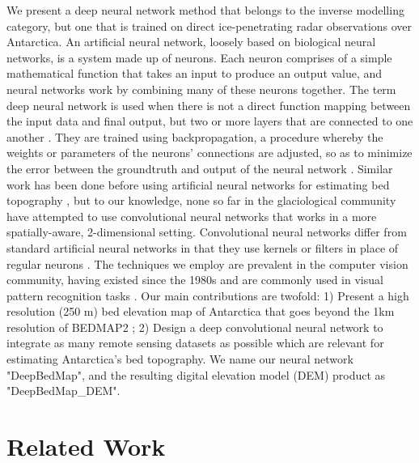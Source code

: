 \documentclass[tc, manuscript]{copernicus}
\begin{document}
We present a deep neural network method that belongs to the inverse modelling category, but one that is trained on direct ice-penetrating radar observations over Antarctica.
An artificial neural network, loosely based on biological neural networks, is a system made up of neurons.
Each neuron comprises of a simple mathematical function that takes an input to produce an output value, and neural networks work by combining many of these neurons together.
The term deep neural network is used when there is not a direct function mapping between the input data and final output, but two or more layers that are connected to one another \citep[see][for a review]{LeCunDeeplearning2015}.
They are trained using backpropagation, a procedure whereby the weights or parameters of the neurons' connections are adjusted, so as to minimize the error between the groundtruth and output of the neural network \citep{RumelhartLearningrepresentationsbackpropagating1986}. Similar work has been done before using artificial neural networks for estimating bed topography \citep[e.g.][]{ClarkeNeuralNetworksApplied2009,MonnierInferencebedtopography2018}, but to our knowledge, none so far in the glaciological community have attempted to use convolutional neural networks that works in a more spatially-aware, 2-dimensional setting.
Convolutional neural networks differ from standard artificial neural networks in that they use kernels or filters in place of regular neurons \citep[again, see][for a review]{LeCunDeeplearning2015}.
The techniques we employ are prevalent in the computer vision community, having existed since the 1980s \citep{FukushimaNeocognitronnewalgorithm1982,LeCunBackpropagationAppliedHandwritten1989} and are commonly used in visual pattern recognition tasks \citep[e.g.][]{LecunGradientbasedlearningapplied1998,KrizhevskyImageNetClassificationDeep2012}.
Our main contributions are twofold:
1) Present a high resolution (250 m) bed elevation map of Antarctica that goes beyond the 1km resolution of BEDMAP2 \citep{FretwellBedmap2improvedice2013};
2) Design a deep convolutional neural network to integrate as many remote sensing datasets as possible which are relevant for estimating Antarctica's bed topography.
We name our neural network "DeepBedMap", and the resulting digital elevation model (DEM) product as "DeepBedMap\_DEM".


\section{Related Work}
\end{document}
